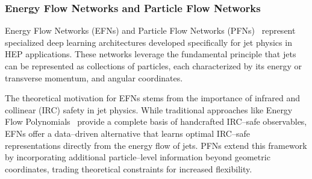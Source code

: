     \subsubsection{Energy Flow Networks and Particle Flow Networks}
        Energy Flow Networks (EFNs) and Particle Flow Networks (PFNs)~\cite{Komiske2019EnergyJets} represent specialized deep learning architectures developed specifically for jet physics in HEP applications.
        These networks leverage the fundamental principle that jets can be represented as collections of particles, each characterized by its energy or transverse momentum, and angular coordinates.

        The theoretical motivation for EFNs stems from the importance of infrared and collinear (IRC) safety in jet physics.
        While traditional approaches like Energy Flow Polynomials~\cite{Komiske2018EnergySubstructure} provide a complete basis of handcrafted IRC--safe observables, EFNs offer a data--driven alternative that learns optimal IRC--safe representations directly from the energy flow of jets.
        PFNs extend this framework by incorporating additional particle--level information beyond geometric coordinates, trading theoretical constraints for increased flexibility.
        
